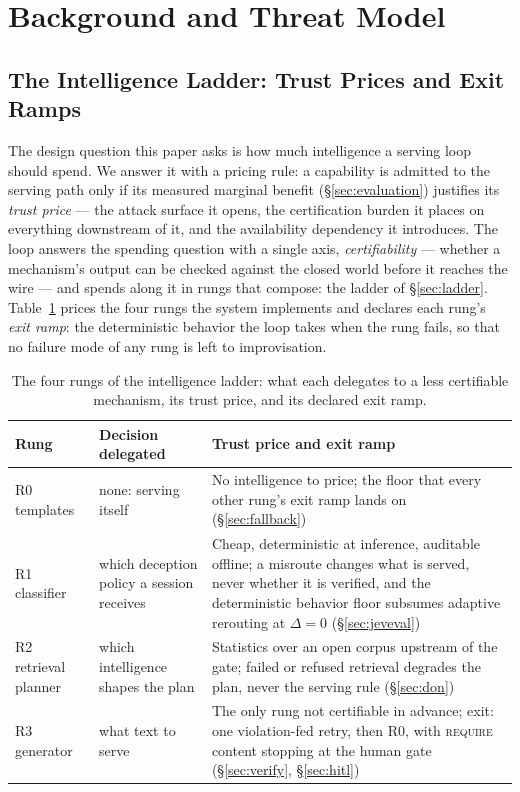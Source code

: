 \section{Background and Threat Model}
\label{sec:threat-model}

\subsection{The Intelligence Ladder: Trust Prices and Exit Ramps}
\label{sec:rungs}

The design question this paper asks is how much intelligence a serving
loop should spend. We answer it with a pricing rule: a capability is
admitted to the serving path only if its measured marginal benefit
(\S\ref{sec:evaluation}) justifies its \emph{trust price} --- the
attack surface it opens, the certification burden it places on
everything downstream of it, and the availability dependency it
introduces. The loop answers the spending question with a single axis,
\emph{certifiability} --- whether a mechanism's output can be checked
against the closed world before it reaches the wire --- and spends
along it in rungs that compose: the ladder of \S\ref{sec:ladder}.
Table~\ref{tab:rungs} prices the four rungs the system implements and
declares each rung's \emph{exit ramp}: the deterministic behavior the
loop takes when the rung fails, so that no failure mode of any rung is
left to improvisation.

\begin{table}[t]
\centering
\caption{The four rungs of the intelligence ladder: what each
delegates to a less certifiable mechanism, its trust price, and its
declared exit ramp.}
\label{tab:rungs}
\scriptsize
\setlength{\tabcolsep}{2.5pt}
\begin{tabular}{p{}p{}p{}}
\toprule
Rung & Decision delegated & Trust price and exit ramp \\
\midrule
R0 templates & none: serving itself & No intelligence to price; the floor that every other rung's exit ramp lands on (\S\ref{sec:fallback}) \\
R1 classifier & which deception policy a session receives & Cheap, deterministic at inference, auditable offline; a misroute changes what is served, never whether it is verified, and the deterministic behavior floor subsumes adaptive rerouting at $\Delta{=}0$ (\S\ref{sec:jeveval}) \\
R2 retrieval planner & which intelligence shapes the plan & Statistics over an open corpus upstream of the gate; failed or refused retrieval degrades the plan, never the serving rule (\S\ref{sec:don}) \\
R3 generator & what text to serve & The only rung not certifiable in advance; exit: one violation-fed retry, then R0, with \textsc{require} content stopping at the human gate (\S\ref{sec:verify}, \S\ref{sec:hitl}) \\
\bottomrule
\end{tabular}
\end{table}

